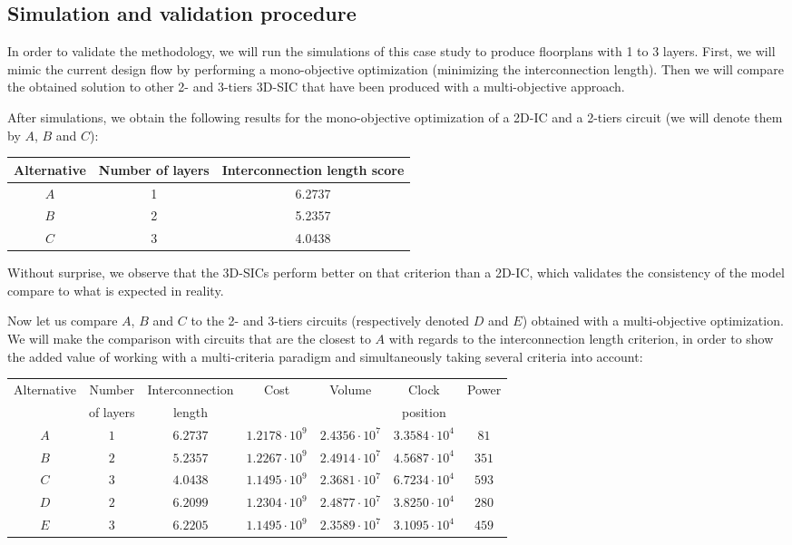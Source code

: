 \subsection{Simulation and validation procedure}
In order to validate the methodology, we will run the simulations of this case study to produce floorplans with 1 to 3 layers. First, we will mimic the current design flow by performing a mono-objective optimization (minimizing the interconnection length). Then we will compare the obtained solution to other 2- and 3-tiers 3D-SIC that have been produced with a multi-objective approach.

After simulations, we obtain the following results for the mono-objective optimization of a 2D-IC and a 2-tiers circuit (we will denote them by $A$, $B$ and $C$):
\begin{center}
\begin{small}
\begin{tabular}{|c|c|c|}
\hline
Alternative & Number of layers & Interconnection length score\\
\hline
$A$ & 1 & 6.2737\\
$B$ & 2 & 5.2357\\
$C$ & 3 & 4.0438\\
\hline
\end{tabular}
\end{small}
\end{center}

Without surprise, we observe that the 3D-SICs perform better on that criterion than a 2D-IC, which validates the consistency of the model compare to what is expected in reality.

Now let us compare $A$, $B$ and $C$ to the 2- and 3-tiers circuits (respectively denoted $D$ and $E$) obtained with a multi-objective optimization. We will make the comparison with circuits that are the closest to $A$ with regards to the interconnection length criterion, in order to show the added value of working with a multi-criteria paradigm and simultaneously taking several criteria into account:
\begin{center}
\begin{footnotesize}
\begin{tabular}{|c|c|ccccc|}
\hline
Alternative & Number & Interconnection & Cost & Volume & Clock & Power\\
 & of layers & length & & & position & \\
\hline
$A$ & $1$ & $6.2737$ & $1.2178\cdot10^9$ & $2.4356\cdot 10^7$ & $3.3584\cdot 10^4$ & $81$ \\
$B$ & $2$ & $5.2357$ & $1.2267\cdot10^9$ & $2.4914\cdot 10^7$ & $4.5687\cdot 10^4$ & $351$ \\
$C$ & $3$ & $4.0438$ & $1.1495\cdot10^9$ & $2.3681\cdot 10^7$ & $6.7234\cdot 10^4$ & $593$ \\
$D$ & $2$ & $6.2099$ & $1.2304\cdot10^9$ & $2.4877\cdot 10^7$ & $3.8250\cdot 10^4$ & $280$ \\
$E$ & $3$ & $6.2205$ & $1.1495\cdot10^9$ & $2.3589\cdot 10^7$ & $3.1095\cdot 10^4$ & $459$ \\
\hline
\end{tabular}
\end{footnotesize}
\end{center}

